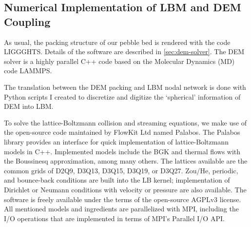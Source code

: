 \subsection{Numerical Implementation of LBM and DEM Coupling}\label{sec:lbm-solver}

As usual, the packing structure of our pebble bed is rendered with the code LIGGGHTS. Details of the software are described in \cref{sec:dem-solver}. The DEM solver is a highly parallel C++ code based on the Molecular Dynamics (MD) code LAMMPS.\cite{Plimpton1995} 

The translation between the DEM packing and LBM nodal network is done with Python scripts I created to discretize and digitize the `spherical' information of DEM into LBM.

To solve the lattice-Boltzmann collision and streaming equations, we make use of the open-source code maintained by FlowKit Ltd named Palabos.\cite{Flow} The Palabos library provides an interface for quick implementation of lattice-Boltzmann models in C++. Implemented models include the BGK and thermal flows with the Boussinesq approximation, among many others. The lattices available are the common grids of D2Q9, D3Q13, D3Q15, D3Q19, or D3Q27. Zou/He, periodic, and bounce-back conditions are built into the LB kernel; implementation of Dirichlet or Neumann conditions with velocity or pressure are also available. The software is freely available under the terms of the open-source AGPLv3 license.\cite{FreeSoftwareFoundationInc.2007} All mentioned models and ingredients are parallelized with MPI, including the I/O operations that are implemented in terms of MPI’s Parallel I/O API.